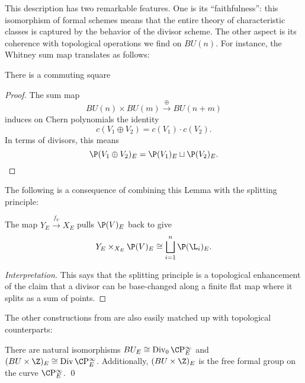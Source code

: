 This description has two remarkable features.  One is its ``faithfulness'': this isomorphism of formal schemes means that the entire theory of characteristic classes is captured by the behavior of the divisor scheme.  The other aspect is its coherence with topological operations we find on $BU(n)$.  For instance, the Whitney sum map translates as follows:

\begin{lemma}\label{WhitneySumOfDivisors}
There is a commuting square
\begin{center}
\end{center}
\end{lemma}
\begin{proof}
The sum map \[BU(n) \times BU(m) \xrightarrow\oplus BU(n+m)\] induces on Chern polynomials the identity~\cite[Theorem 16.2.d]{Switzer} \[c(V_1 \oplus V_2) = c(V_1) \cdot c(V_2).\]  In terms of divisors, this means \[\P(V_1 \oplus V_2)_E = \P(V_1)_E \sqcup \P(V_2)_E. \qedhere\]
\end{proof}

The following is a consequence of combining this Lemma with the splitting principle:

\begin{corollary}
The map $Y_E \xrightarrow{f_V} X_E$ pulls $\P(V)_E$ back to give \[Y_E \times_{X_E} \P(V)_E \cong \bigsqcup_{i=1}^n \P(\L_i)_E.\]
\end{corollary}
\begin{proof}[Interpretation]
This says that the splitting principle is a topological enhancement of the claim that a divisor can be base-changed along a finite flat map where it splits as a sum of points.
\end{proof}

The other constructions from  are also easily matched up with topological counterparts:

\begin{corollary}\label{ECohomBUIsFree}
There are natural isomorphisms $BU_E \cong \Div_0 \CP^\infty_E$ and $(BU \times \Z)_E \cong \Div \CP^\infty_E$. Additionally, $(BU \times \Z)_E$ is the free formal group on the curve $\CP^\infty_E$. \qed
\end{corollary}

